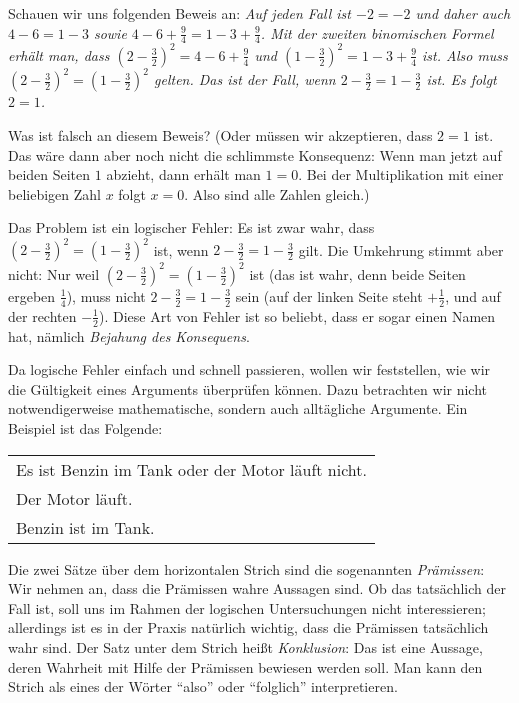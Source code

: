 \documentclass{zusammenfassung}
\begin{document}

Schauen wir uns folgenden Beweis an: \emph{Auf jeden Fall ist $-2=-2$ und daher auch $4-6=1-3$ sowie $4-6+\frac 94=1-3+\frac 94$.
  Mit der zweiten binomischen Formel erhält man, dass $(2-\frac 32)^2=4-6+\frac 94$ und $(1-\frac 32)^2=1-3+\frac 94$ ist. Also
muss $(2-\frac 32)^2=(1-\frac 32)^2$ gelten. Das ist der Fall, wenn $2-\frac 32=1-\frac 32$ ist. Es folgt $2=1$.}

Was ist falsch an diesem Beweis? (Oder müssen wir akzeptieren, dass $2=1$ ist. Das wäre dann aber noch nicht die schlimmste
Konsequenz: Wenn man jetzt auf beiden Seiten $1$ abzieht, dann erhält man $1=0$. Bei der Multiplikation mit einer beliebigen Zahl
$x$ folgt $x=0$. Also sind alle Zahlen gleich.)

Das Problem ist ein logischer Fehler: Es ist zwar wahr, dass $(2-\frac 32)^2=(1-\frac 32)^2$ ist, wenn $2-\frac 32=1-\frac 32$
gilt. Die Umkehrung stimmt aber nicht: Nur weil $(2-\frac 32)^2=(1-\frac 32)^2$ ist (das ist wahr, denn beide Seiten ergeben 
$\frac 14$), muss nicht $2-\frac 32=1-\frac 32$ sein (auf der linken Seite steht $+\frac 12$, und auf der rechten $-\frac 12$).
Diese Art von Fehler ist so beliebt, dass er sogar einen Namen hat, nämlich \emph{Bejahung des Konsequens}. 

Da logische Fehler einfach und schnell passieren, wollen wir feststellen, wie wir die Gültigkeit eines Arguments überprüfen
können. Dazu betrachten wir nicht notwendigerweise mathematische, sondern auch alltägliche Argumente. Ein Beispiel ist das
Folgende:

\begin{tabular}{l}
  Es ist Benzin im Tank oder der Motor läuft nicht.\\
  Der Motor läuft.\\
  \hline
  Benzin ist im Tank.
\end{tabular}

Die zwei Sätze über dem horizontalen Strich sind die sogenannten \emph{Prämissen}: Wir nehmen an, dass die Prämissen wahre
Aussagen sind. Ob das tatsächlich der Fall ist, soll uns im Rahmen der logischen Untersuchungen nicht interessieren; allerdings
ist es in der Praxis natürlich wichtig, dass die Prämissen tatsächlich wahr sind. Der Satz unter dem Strich heißt
\emph{Konklusion}: Das ist eine Aussage, deren Wahrheit mit Hilfe der Prämissen bewiesen werden soll. Man kann den Strich als
eines der Wörter "`also"' oder "`folglich"' interpretieren.
\end{document}

